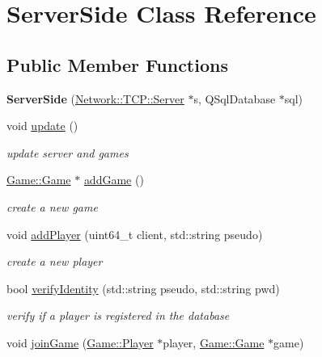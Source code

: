 \hypertarget{class_server_side}{}\section{Server\+Side Class Reference}
\label{class_server_side}
\subsection*{Public Member Functions}
\begin{DoxyCompactItemize}
\item 
\mbox{\label{class_server_side_ac92ebebcd1584bad466ef8cf4a82bcb4}} 
{\bfseries Server\+Side} (\hyperlink{class_network_1_1_t_c_p_1_1_server}{Network\+::\+T\+C\+P\+::\+Server} $\ast$s, Q\+Sql\+Database $\ast$sql)
\item 
\mbox{\label{class_server_side_af75665fbf2ff41dddba59690c70e42d2}} 
void \hyperlink{class_server_side_af75665fbf2ff41dddba59690c70e42d2}{update} ()
\begin{DoxyCompactList}\small\item\em update server and games \end{DoxyCompactList}\item 
\hyperlink{class_game_1_1_game}{Game\+::\+Game} $\ast$ \hyperlink{class_server_side_a5f3536e4bd9f33730fe85fd19869a30e}{add\+Game} ()
\begin{DoxyCompactList}\small\item\em create a new game \end{DoxyCompactList}\item 
void \hyperlink{class_server_side_a7262ec7d1a2574b79879b3d83f16d0e6}{add\+Player} (uint64\+\_\+t client, std\+::string pseudo)
\begin{DoxyCompactList}\small\item\em create a new player \end{DoxyCompactList}\item 
bool \hyperlink{class_server_side_a5749ff8a423154031b8fd43ffca84737}{verify\+Identity} (std\+::string pseudo, std\+::string pwd)
\begin{DoxyCompactList}\small\item\em verify if a player is registered in the database \end{DoxyCompactList}\item 
void \hyperlink{class_server_side_a4a6174bdaef5367b91277539fe60bca0}{join\+Game} (\hyperlink{class_game_1_1_player}{Game\+::\+Player} $\ast$player, \hyperlink{class_game_1_1_game}{Game\+::\+Game} $\ast$game)

\end{DoxyCompactItemize}
